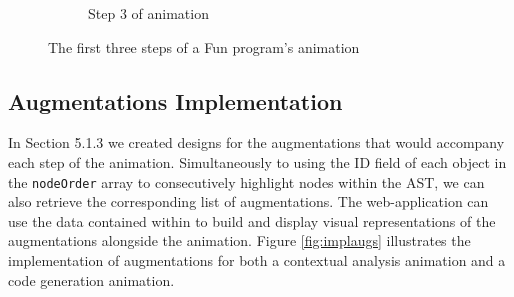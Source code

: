 \documentclass{l4proj}
\begin{document}
\begin{figure}[h]
\begin{subfigure}[b]{.33\textwidth}
		\caption{Step 3 of animation}
	\end{subfigure}	
	\caption{The first three steps of a Fun program's animation}
	\label{fig:implanim}	
\end{figure}

\subsection{Augmentations Implementation}
In Section 5.1.3 we created designs for the augmentations that would accompany each step of the animation. Simultaneously to using the ID field of each object in the \texttt{nodeOrder} array to consecutively highlight nodes within the AST, we can also retrieve the corresponding list of augmentations. The web-application can use the data contained within to build and display visual representations of the augmentations alongside the animation. Figure \ref{fig:implaugs} illustrates the implementation of augmentations for both a contextual analysis animation and a code generation animation. 
\end{document}
